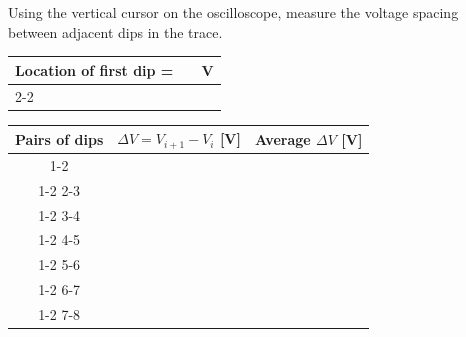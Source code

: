 \documentclass[addpoints]{physlabs} %
\begin{document}
\begin{postlab}


    \filbreak
    \question[7] Using the vertical cursor on the oscilloscope, measure the voltage spacing between adjacent dips in the trace.

    \begin{tabular}{lp{3cm}l}
         Location of first dip = & & V \\
         \cline{2-2}
    \end{tabular}

    \begin{center}
        \renewcommand{\arraystretch}{2}
        \captionsetup{font=normalsize}
        \begin{tabular}{|c|>{\centering\arraybackslash}p{5cm}|>{\centering\arraybackslash}p{4cm}|}
            \hline
            \rowcolor{gray!20}
            Pairs of dips & $\Delta V = V_{i+1} - V_i$ [V] & Average $\Delta V$ [V]
            \\
            \hline
            1-2 & & \\ \cline{1-2}
            2-3 & & \\ \cline{1-2}
            3-4 & & \\ \cline{1-2}
            4-5 & & \\ \cline{1-2}
            5-6 & & \\ \cline{1-2}
            6-7 & & \\ \cline{1-2}
            7-8 & & \\ \hline
        \end{tabular}
    \end{center}

    \filbreak
    \question
\end{postlab}
\end{document}
